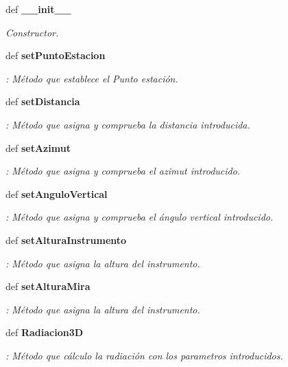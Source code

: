 \begin{DoxyCompactItemize}
\item 
def {\bf \-\_\-\-\_\-init\-\_\-\-\_\-}
\begin{DoxyCompactList}\small\item\em Constructor. \end{DoxyCompactList}\item 
def {\bf set\-Punto\-Estacion}
\begin{DoxyCompactList}\small\item\em \-: Método que establece el Punto estación. \end{DoxyCompactList}\item 
def {\bf set\-Distancia}
\begin{DoxyCompactList}\small\item\em \-: Método que asigna y comprueba la distancia introducida. \end{DoxyCompactList}\item 
def {\bf set\-Azimut}
\begin{DoxyCompactList}\small\item\em \-: Método que asigna y comprueba el azimut introducido. \end{DoxyCompactList}\item 
def {\bf set\-Angulo\-Vertical}
\begin{DoxyCompactList}\small\item\em \-: Método que asigna y comprueba el ángulo vertical introducido. \end{DoxyCompactList}\item 
def {\bf set\-Altura\-Instrumento}
\begin{DoxyCompactList}\small\item\em \-: Método que asigna la altura del instrumento. \end{DoxyCompactList}\item 
def {\bf set\-Altura\-Mira}
\begin{DoxyCompactList}\small\item\em \-: Método que asigna la altura del instrumento. \end{DoxyCompactList}\item 
def {\bf Radiacion3\-D}
\begin{DoxyCompactList}\small\item\em \-: Método que cálculo la radiación con los parametros introducidos. \end{DoxyCompactList}\end{DoxyCompactItemize}
